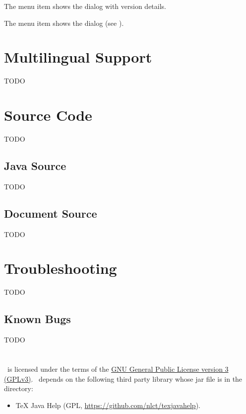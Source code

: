 
The  menu item shows the 
dialog with version details.


The  menu item shows the 
dialog (see ).



\chapter{Multilingual Support}\label{sec:multilingualsupport}

TODO


\chapter{Source Code}\label{sec:sourcecode}

TODO


\section{Java Source}\label{sec:javasource}

TODO


\section{Document Source}\label{sec:docsource}

TODO


\chapter{Troubleshooting}\label{sec:troubleshooting}

TODO


\section{Known Bugs}\label{sec:knownbugs}

TODO

\chapter{}
\label{sec:licence}

%
\FlowframTk\ is licensed under the terms of the 
\href{https://www.gnu.org/licenses/gpl-3.0.html}{GNU General
Public License version 3 (GPLv3)}.
\FlowframTk\ depends on the following third party library whose
jar file is in the  directory:
\begin{itemize}
   \item TeX Java Help 
   (GPL, \url{https://github.com/nlct/texjavahelp}).
\end{itemize}





\printmain
\printindex 

 

